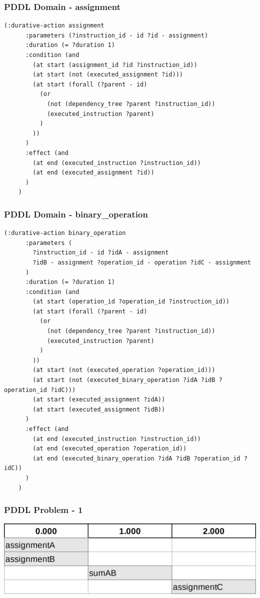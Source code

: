 \documentclass{beamer}
\begin{document}
\begin{frame}[fragile]
  \frametitle{PDDL Domain - assignment}

  \begin{lstlisting}[style=pddlStyle,basicstyle=\ttfamily\fontsize{10pt}{10pt}\selectfont]
    (:durative-action assignment
      :parameters (?instruction_id - id ?id - assignment)
      :duration (= ?duration 1)
      :condition (and
        (at start (assignment_id ?id ?instruction_id))
        (at start (not (executed_assignment ?id)))
        (at start (forall (?parent - id)
          (or
            (not (dependency_tree ?parent ?instruction_id))
            (executed_instruction ?parent)
          )
        ))
      )
      :effect (and
        (at end (executed_instruction ?instruction_id))
        (at end (executed_assignment ?id))
      )
    )
  \end{lstlisting}
\end{frame}

\begin{frame}[fragile]
  \frametitle{PDDL Domain - binary\_operation}

  \begin{lstlisting}[style=pddlStyle,basicstyle=\ttfamily\fontsize{8pt}{8pt}\selectfont]
    (:durative-action binary_operation
      :parameters (
        ?instruction_id - id ?idA - assignment
        ?idB - assignment ?operation_id - operation ?idC - assignment
      )
      :duration (= ?duration 1)
      :condition (and
        (at start (operation_id ?operation_id ?instruction_id))
        (at start (forall (?parent - id)
          (or
            (not (dependency_tree ?parent ?instruction_id))
            (executed_instruction ?parent)
          )
        ))
        (at start (not (executed_operation ?operation_id)))
        (at start (not (executed_binary_operation ?idA ?idB ?operation_id ?idC)))
        (at start (executed_assignment ?idA))
        (at start (executed_assignment ?idB))
      )
      :effect (and
        (at end (executed_instruction ?instruction_id))
        (at end (executed_operation ?operation_id))
        (at end (executed_binary_operation ?idA ?idB ?operation_id ?idC))
      )
    )
  \end{lstlisting}
\end{frame}

\begin{frame}[fragile]
  \frametitle{PDDL Problem - 1}

  \includegraphics[width=1\textwidth]{../images/parallel-tasks-Parallel.png}
\end{frame}
\end{document}
